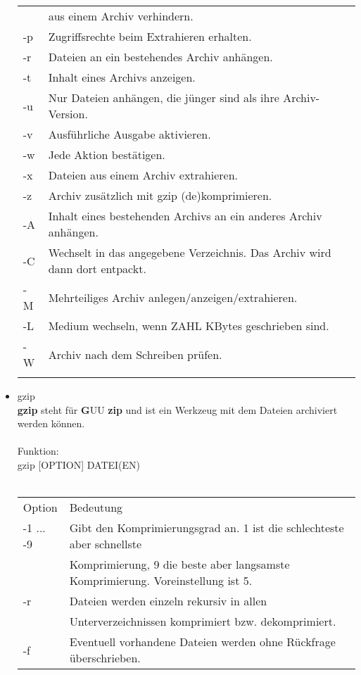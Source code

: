 \begin{itemize}
\begin{tabular}{ll}
				& aus einem Archiv verhindern.\\
				-p & Zugriffsrechte beim Extrahieren erhalten.\\
				-r & Dateien an ein bestehendes Archiv anh\"angen.\\
				-t & Inhalt eines Archivs anzeigen.\\
				-u & Nur Dateien anh\"angen, die jünger sind als ihre Archiv-Version.\\
				-v & Ausf\"uhrliche Ausgabe aktivieren.\\
				-w & Jede Aktion best\"atigen.\\
				-x & Dateien aus einem Archiv extrahieren.\\
				-z & Archiv zus\"atzlich mit gzip (de)komprimieren.\\
				-A & Inhalt eines bestehenden Archivs an ein anderes Archiv anh\"angen.\\
				-C & Wechselt in das angegebene Verzeichnis. Das Archiv wird dann dort entpackt.\\
				-M & Mehrteiliges Archiv anlegen/anzeigen/extrahieren.\\
				-L & Medium wechseln, wenn ZAHL KBytes geschrieben sind.\\
				-W & Archiv nach dem Schreiben pr\"ufen.\\ \\ 
			\end{tabular}
			\newpage
			\item gzip\\
			\textbf{gzip} steht f\"ur \textbf{G}UU \textbf{zip} und ist ein Werkzeug mit dem Dateien archiviert werden k\"onnen.\\ \\
			Funktion:\\
			gzip [OPTION] DATEI(EN)\\ \\
			\begin{tabular}{ll}
				Option & Bedeutung \\
				-1 ... -9 & Gibt den Komprimierungsgrad an. 1 ist die schlechteste aber schnellste\\
				& Komprimierung, 9 die beste aber langsamste Komprimierung. Voreinstellung ist 5.\\
				-r & Dateien werden einzeln rekursiv in allen\\
				& Unterverzeichnissen komprimiert bzw. dekomprimiert.\\
				-f & Eventuell vorhandene Dateien werden ohne R\"uckfrage \"uberschrieben.\\

\end{tabular}
\end{itemize}
